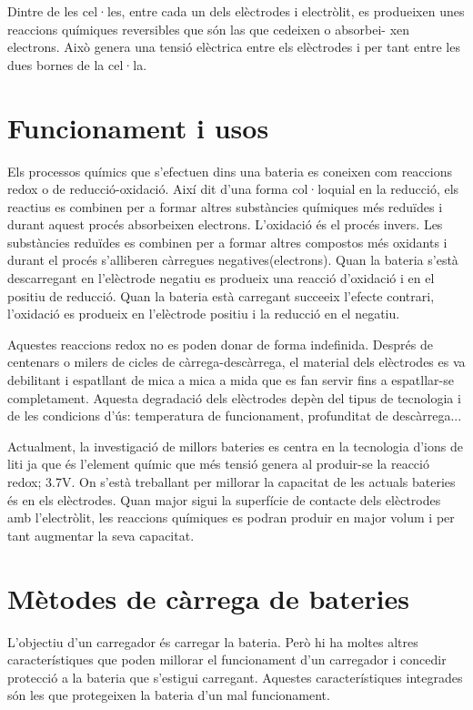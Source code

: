 Dintre de les cel·les, entre cada un dels elèctrodes i electròlit, es produeixen unes reaccions químiques reversibles que són las que cedeixen o absorbei- \newline xen electrons. Això genera una tensió elèctrica entre els elèctrodes i per tant entre les dues bornes de la cel·la.                    

\section{Funcionament i usos}
Els processos químics que s'efectuen dins una bateria es coneixen com reaccions redox o de reducció-oxidació. Així dit d'una forma col·loquial en la reducció, els reactius es combinen per a formar altres substàncies químiques més reduïdes i durant aquest procés absorbeixen electrons. \newline L’oxidació és el procés invers. Les substàncies reduïdes es combinen per a formar altres compostos més oxidants i durant el procés s’alliberen \newline càrregues negatives(electrons). Quan la bateria s’està descarregant en \newline l’elèctrode negatiu es produeix una reacció d’oxidació i en el positiu de reducció. Quan la bateria està carregant succeeix l’efecte contrari, l’oxidació es produeix en l'elèctrode positiu i la reducció en el negatiu.

Aquestes reaccions redox no es poden donar de forma indefinida. Després de centenars o milers de cicles de càrrega-descàrrega, el material dels elèctrodes es va debilitant i espatllant de mica a mica a mida que es fan servir fins a espatllar-se completament. Aquesta degradació dels elèctrodes depèn del tipus de tecnologia i de les condicions d’ús: temperatura de funcionament, profunditat de descàrrega...

Actualment, la investigació de millors bateries es centra en la tecnologia d'ions de liti ja que és l’element químic que més tensió genera al produir-se la reacció redox; 3.7V. On s’està treballant per millorar la capacitat de les actuals bateries és en els elèctrodes. Quan major sigui la superfície de contacte dels elèctrodes amb l'electròlit, les reaccions químiques es podran produir en major volum i per tant augmentar la seva capacitat.                 

\section{Mètodes de càrrega de bateries}
L'objectiu d'un carregador és carregar la bateria. Però hi ha moltes altres característiques que poden millorar el funcionament d'un carregador i concedir protecció a la bateria que s'estigui carregant. Aquestes característiques integrades són les que protegeixen la bateria d'un mal funcionament.

